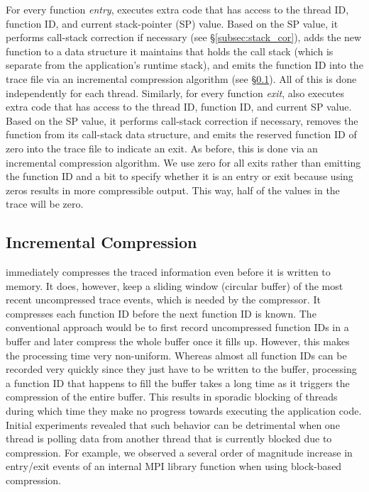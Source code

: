 For every function \emph{entry}, \parlot executes extra code that has access to the thread ID, function ID, and current stack-pointer (SP) value. Based on the SP value, it performs call-stack correction if necessary (see \S\ref{subsec:stack_cor}), adds the new function to a data structure it maintains that holds the call stack (which is separate from the application's runtime stack), and emits the function ID into the trace file via an incremental compression algorithm (see \S\ref{subsec:incr-compr}). All of this is done independently for each thread. Similarly, for every function \emph{exit}, \parlot also executes extra code that has access to the thread ID, function ID, and current SP value. Based on the SP value, it performs call-stack correction if necessary, removes the function from its call-stack data structure, and emits the reserved function ID of zero into the trace file to indicate an exit. As before, this is done via an incremental compression algorithm. We use zero for all exits rather than emitting the function ID and a bit to specify whether it is an entry or exit because using zeros results in more compressible output. This way, half of the values in the trace will be zero.





\subsection{Incremental Compression}
\label{subsec:incr-compr}

\parlot immediately compresses the traced information even before it is written to memory. It does, however, keep a sliding window (circular buffer) of the most recent uncompressed trace events, which is needed by the compressor. It compresses each function ID before the next function ID is known. The conventional approach would be to first record uncompressed function IDs in a buffer and later compress the whole buffer once it fills up. However, this makes the processing time very non-uniform. Whereas almost all function IDs can be recorded very quickly since they just have to be written to the buffer, processing a function ID that happens to fill the buffer takes a long time as it triggers the compression of the entire buffer. This results in sporadic blocking of threads during which time they make no progress towards executing the application code. Initial experiments revealed that such behavior can be detrimental when one thread is polling data from another thread that is currently blocked due to compression. For example, we observed a several order of magnitude increase in entry/exit events of an internal MPI library function when using block-based compression.

